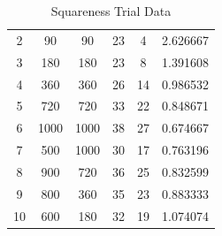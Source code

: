 \documentclass[10pt]{article}
\begin{document}
\begin{table}[H]
\begin{tabular}{cccccc}
        2  & 90   & 90   & 23 & 4  & 2.626667 \\
        3  & 180  & 180  & 23 & 8  & 1.391608 \\
        4  & 360  & 360  & 26 & 14 & 0.986532 \\
        5  & 720  & 720  & 33 & 22 & 0.848671 \\
        6  & 1000 & 1000 & 38 & 27 & 0.674667 \\
        7  & 500  & 1000 & 30 & 17 & 0.763196 \\
        8  & 900  & 720  & 36 & 25 & 0.832599 \\
        9  & 800  & 360  & 35 & 23 & 0.883333 \\
        10 & 600  & 180  & 32 & 19 & 1.074074 \\

        \bottomrule
    \end{tabular}
    \caption{Squareness Trial Data}
\end{table}
\end{document}
